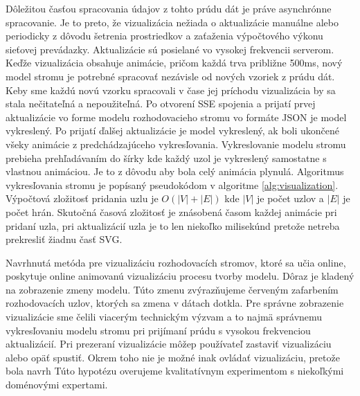 Dôležitou časťou spracovania údajov z tohto prúdu dát je práve asynchrónne spracovanie. Je to preto, že vizualizácia nežiada o aktualizácie manuálne alebo periodicky z dôvodu šetrenia prostriedkov a zaťaženia výpočtového výkonu sieťovej prevádazky. Aktualizácie sú posielané vo vysokej frekvencii serverom. Keďže vizualizácia obsahuje animácie, pričom každá trva približne 500ms, nový model stromu je potrebné spracovať nezávisle od nových vzoriek z prúdu dát. Keby sme každú novú vzorku spracovali v čase jej príchodu vizualizácia by sa stala nečitateľná a nepoužiteľná. Po otvorení SSE spojenia a prijatí prvej aktualizácie vo forme modelu rozhodovacieho stromu vo formáte JSON je model vykreslený. Po prijatí ďalšej aktualizácie je model vykreslený, ak boli ukončené všeky animácie z predchádzajúceho vykresľovania. Vykreslovanie modelu stromu prebieha prehľadávaním do šírky kde každý uzol je vykreslený samostatne s vlastnou animáciou. Je to z dôvodu aby bola celý animácia plynulá. Algoritmus vykresľovania stromu je popísaný pseudokódom v algoritme \ref{alg:visualization}. Výpočtová zložitosť pridania uzlu je $O(|V| + |E|)$ kde $|V|$ je počet uzlov a $|E|$ je počet hrán. Skutočná časová zložitosť je znásobená časom každej animácie pri pridaní uzla, pri aktualizácií uzla je to len niekoľko milisekúnd pretože netreba prekresliť žiadnu časť SVG.
\par
Navrhnutá metóda pre vizualizáciu rozhodovacích stromov, ktoré sa učia online, poskytuje online animovanú vizualizáciu procesu tvorby modelu. Dôraz je kladený na zobrazenie zmeny modelu. Túto zmenu zvýrazňujeme červeným zafarbením rozhodovacích uzlov, ktorých sa zmena v dátach dotkla. Pre správne zobrazenie vizualizácie sme čelili viacerým technickým výzvam a to najmä správnemu vykresľovaniu modelu stromu pri prijímaní prúdu s vysokou frekvenciou aktualizácií. Pri prezeraní vizualizácie môžep používateľ zastaviť vizualizáciu alebo opäť spustiť. Okrem toho nie je možné inak ovládať vizualizáciu, pretože bola navrh Túto hypotézu overujeme kvalitatívnym experimentom s niekoľkými doménovými expertami.
\par

